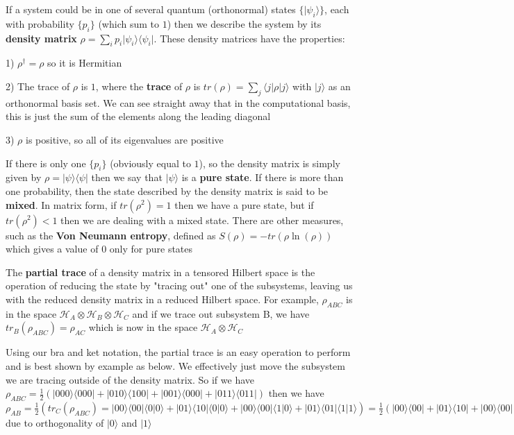 \documentclass[12pt,a4paper]{article}
\numberwithin{equation}{section}
\begin{document}
\vskip 2mm

If a system could be in one of several quantum (orthonormal) states $\{|\psi_i\rangle\}$, each with probability $\{p_i\}$  (which sum to $1$) then we describe the system by its {\bf density matrix} $\rho = \sum_{i} p_i{|\psi_i\rangle}{\langle\psi_i|}$. These density matrices have the properties:

1) $\rho^\dagger = \rho$ so it is Hermitian

2) The trace of $\rho$ is $1$, where the {\bf trace} of $\rho$ is $tr(\rho) = \sum_{j} \langle j| \rho | j\rangle$ with ${|j\rangle}$ as an orthonormal basis set. We can see straight away that in the computational basis, this is just the sum of the elements along the leading diagonal

3) $\rho$ is positive, so all of its eigenvalues are positive

\vskip 2mm

If there is only one $\{p_i\}$ (obviously equal to $1$), so the density matrix is simply given by $\rho = |\psi\rangle\langle\psi|$ then we say that $|\psi\rangle$ is a {\bf pure state}. If there is more than one probability, then the state described by the density matrix is said to be {\bf mixed}. In matrix form, if $tr(\rho^2) = 1$ then we have a pure state, but if $tr(\rho^2) < 1$ then we are dealing with a mixed state. There are other measures, such as the {\bf Von Neumann entropy}, defined as $S(\rho) = -tr(\rho \ln(\rho))$ which gives a value of $0$ only for pure states

\vskip 2mm

The {\bf partial trace} of a density matrix in a tensored Hilbert space is the operation of reducing the state by "tracing out" one of the subsystems, leaving us with the reduced density matrix in a reduced Hilbert space. For example, $\rho_{ABC}$ is in the space $\mathcal{H}_{A}\otimes\mathcal{H}_{B}\otimes\mathcal{H}_{C}$ and if we trace out subsystem B, we have $tr_{B}(\rho_{ABC}) = \rho_{AC}$ which is now in the space $\mathcal{H}_{A}\otimes\mathcal{H}_{C}$

Using our bra and ket notation, the partial trace is an easy operation to perform and is best shown by example as below. We effectively just move the subsystem we are tracing outside of the density matrix. So if we have $\rho_{ABC} = \frac{1}{2}\left(|000\rangle\langle000| + |010\rangle\langle100| + |001\rangle\langle000| + |011\rangle\langle011| \right)$ then we have $\rho_{AB} = \frac{1}{2}\left(tr_C(\rho_{ABC}) = |00\rangle\langle00|\langle0|0\rangle + |01\rangle\langle10|\langle0|0\rangle + |00\rangle\langle00|\langle1|0\rangle + |01\rangle\langle01|\langle1|1\rangle\right) = \frac{1}{2}\left(|00\rangle\langle00| + |01\rangle\langle10| + |00\rangle\langle00| + |01\rangle\langle01|\right)$ due to orthogonality of $|0\rangle$ and $|1\rangle$
\end{document}
